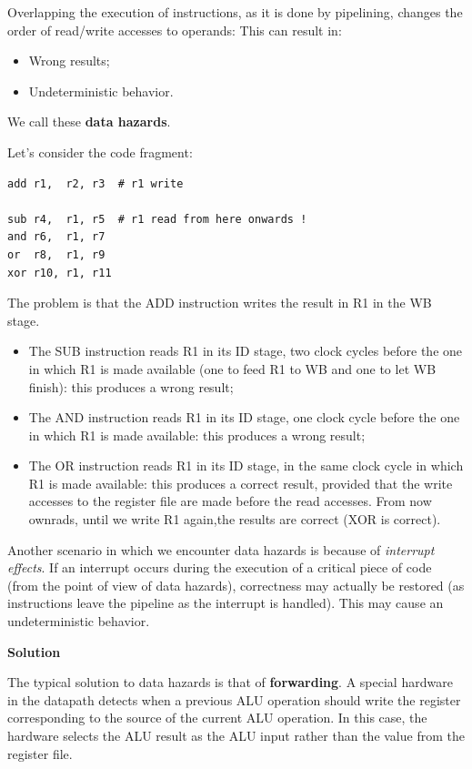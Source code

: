 \documentclass[a4paper,11pt]{article}
\begin{document}
Overlapping the execution of instructions, as it is done by pipelining, changes the order of read/write accesses to operands:
This can result in:
\begin{itemize}
	\item Wrong results;
	\item Undeterministic behavior.
\end{itemize}

We call these \textbf{data hazards}.

Let's consider the code fragment:
\begin{lstlisting}[language=riscv, style=codestyle]	
add r1,  r2, r3  # r1 write 

sub r4,  r1, r5  # r1 read from here onwards !
and r6,  r1, r7
or  r8,  r1, r9
xor r10, r1, r11
\end{lstlisting}

The problem is that the ADD instruction writes the result in R1 in the WB stage.
\begin{itemize}
	\item The SUB instruction reads R1 in its ID stage, two clock cycles before the one in which R1 is made available (one to feed R1 to WB and one to let WB finish): this produces a wrong result;
	\item The AND instruction reads R1 in its ID stage, one clock cycle before the one in which R1 is made available: this produces a wrong result;
	\item The OR instruction reads R1 in its ID stage, in the same clock cycle in which R1 is made available: this produces a correct result, provided that the write accesses to the register file are made before the read accesses. From now ownrads, until we write R1 again,the results are correct (XOR is correct).
\end{itemize}

Another scenario in which we encounter data hazards is because of \textit{interrupt effects}.
If an interrupt occurs during the execution of a critical piece of code (from the point of view of data hazards), correctness may actually be restored (as instructions leave the pipeline as the interrupt is handled).
This may cause an undeterministic behavior.

\par\smallskip
\textbf{\textsf{Solution}}

The typical solution to data hazards is that of \textbf{forwarding}.
A special hardware in the datapath detects when a previous ALU operation should write the register corresponding to the source of the current ALU operation.
In this case, the hardware selects the ALU result as the ALU input rather than the value from the register file.
\end{document}
